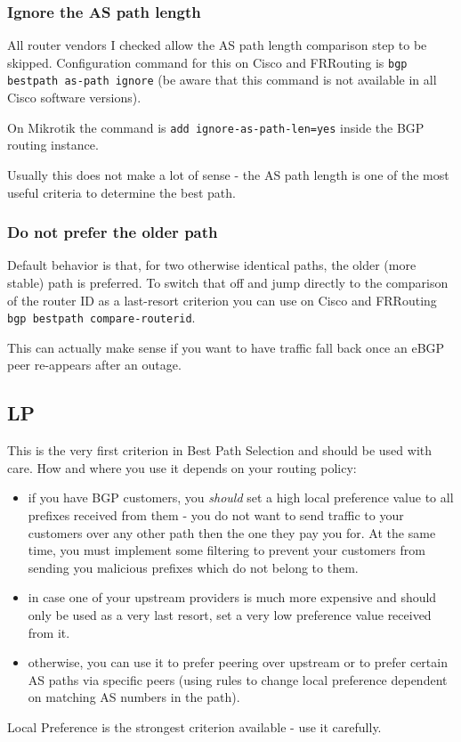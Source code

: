 \subsubsection{Ignore the AS path length}
All router vendors I checked allow the AS path length comparison step to be skipped. Configuration command for this on Cisco and FRRouting is \verb+bgp bestpath as-path ignore+ (be aware that this command is not available in all Cisco software versions).

On Mikrotik the command is \verb+add ignore-as-path-len=yes+ inside the BGP routing instance.

Usually this does not make a lot of sense - the AS path length is one of the most useful criteria to determine the best path.

\subsubsection{Do not prefer the older path}
Default behavior is that, for two otherwise identical paths, the older (more stable) path is preferred. To switch that off and jump directly to the comparison of the router ID as a last-resort criterion you can use on Cisco and FRRouting \verb+bgp bestpath compare-routerid+.

This can actually make sense if you want to have traffic fall back once an eBGP peer re-appears after an outage.

\subsection{\Gls{LP}}
This is the very first criterion in Best Path Selection and should be used with care.  How and where you use it depends on your routing policy:
\begin{itemize}
  \item if you have BGP customers, you \emph{should} set a high local preference value to all prefixes received from them - you do not want to send traffic to your customers over any other path then the one they pay you for. At the same time, you must implement some filtering to prevent your customers from sending you malicious prefixes which do not belong to them.
  \item in case one of your upstream providers is much more expensive and should only be used as a very last resort, set a very low preference value received from it.
  \item otherwise, you can use it to prefer peering over upstream or to prefer certain AS paths via specific peers (using rules to change local preference dependent on matching AS numbers in the path).
\end{itemize}
Local Preference is the strongest criterion available - use it carefully.

